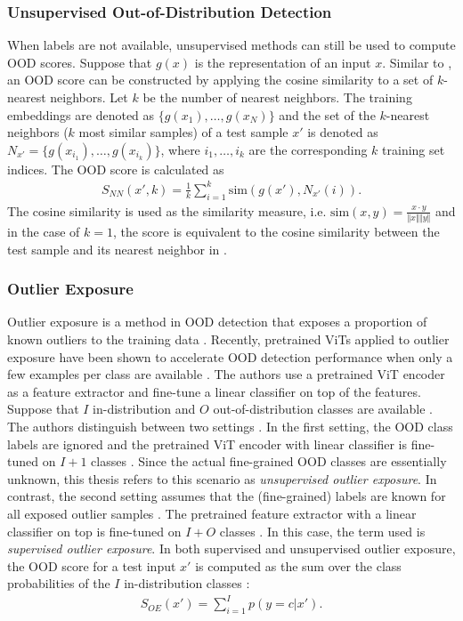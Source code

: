 \subsubsection{Unsupervised Out-of-Distribution Detection}
\label{section: Unsupervised Out-of-Distribution Detection}
When labels are not available, unsupervised methods can still be used to compute OOD scores.
Suppose that $g(x)$ is the representation of an input $x$.
Similar to \citep{Michels2023,Sun2022}, an OOD score can be constructed by applying the cosine similarity to a set of $k$-nearest neighbors.
Let $k$ be the number of nearest neighbors.
The training embeddings are denoted as $\{g(x_1),\dots,g(x_N)\}$ and the set of the $k$-nearest neighbors ($k$ most similar samples) of a test sample $x'$ is denoted as $N_{x'} = \{g(x_{i_1}),\dots,g(x_{i_k})\}$, where $i_1,\dots,i_k$ are the corresponding $k$ training set indices.
The OOD score is calculated as \citep{Michels2023,Sun2022}
\begin{align}
	S_{NN}(x',k) = \frac{1}{k}\sum_{i=1}^k \text{sim}(g(x'),N_{x'}(i)).
	\label{equation:knn-score}
\end{align}
The cosine similarity is used as the similarity measure, i.e. $\text{sim}(x,y) = \frac{x\cdot y}{\Vert x \Vert \Vert y \Vert}$ and in the case of $k=1$, the score is equivalent to the cosine similarity between the test sample and its nearest neighbor in \citep{Michels2023}.
\subsubsection{Outlier Exposure}
\label{section: Outlier Exposure}
Outlier exposure is a method in OOD detection that exposes a proportion of known outliers to the training data \citep{Hendrycks2018}.
Recently, pretrained ViTs applied to outlier exposure have been shown to accelerate OOD detection performance when only a few examples per class are available \citep{Fort2021}.
The authors use a pretrained ViT encoder as a feature extractor and fine-tune a linear classifier on top of the features.
Suppose that $I$ in-distribution and $O$ out-of-distribution classes are available \citep{Fort2021}.
The authors distinguish between two settings \citep{Fort2021}.
In the first setting, the OOD class labels are ignored and the pretrained ViT encoder with linear classifier is fine-tuned on $I+1$ classes \citep{Fort2021,Thulasidasan2021}.
Since the actual fine-grained OOD classes are essentially unknown, this thesis refers to this scenario as \textit{unsupervised outlier exposure}.
In contrast, the second setting assumes that the (fine-grained) labels are known for all exposed outlier samples \citep{Fort2021,Roy2021}.
The pretrained feature extractor with a linear classifier on top is fine-tuned on $I+O$ classes \citep{Fort2021}.
In this case, the term used is \textit{supervised outlier exposure}.
In both supervised and unsupervised outlier exposure, the OOD score for a test input $x'$ is computed as the sum over the class probabilities of the $I$ in-distribution classes \citep{Fort2021}:
\begin{align}
	S_{OE}(x') = \sum_{i=1}^{I}p(y=c|x'). 
\end{align}
